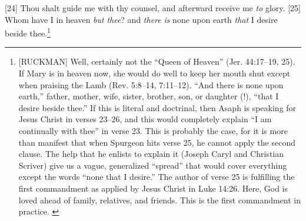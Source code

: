 [24] \textcolor[rgb]{0.00,0.00,1.00}{Thou shalt guide me with thy counsel, and afterward receive me \emph{to} glory.}
[25] \textcolor[rgb]{0.00,0.00,1.00}{Whom have I in heaven \emph{but} \emph{thee}? and \emph{there} \emph{is} none upon earth \emph{that} I desire beside thee.}\footnote{[RUCKMAN] Well, certainly not the “Queen of Heaven” (Jer. 44:17--19, 25). If Mary is in heaven now, she would do well to keep her mouth shut except when praising the Lamb (Rev. 5:8--14, 7:11--12). “And there is none upon earth,” father, mother, wife, sister, brother, son, or daughter (!), “that I desire beside thee.” If this is literal and doctrinal, then Asaph is speaking for Jesus Christ in verses 23--26, and this would completely explain “I am continually with thee” in verse 23. This is probably the case, for it is more than manifest that when Spurgeon hits verse 25, he cannot apply the second clause. The help that he enlists to explain it (Joseph Caryl and Christian Scriver) give us a vague, generalized “spread” that would cover everything except the words “none that I desire.” The author of verse 25 is fulfilling the first commandment as applied by Jesus Christ in Luke 14:26. Here, God is loved ahead of family, relatives, and friends. This is the first commandment in practice.  \cite{Ruckman1992Psalms}  }

